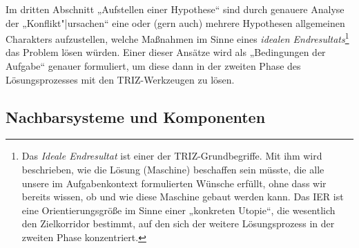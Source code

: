 \documentclass[11pt,a4paper]{article}
\begin{document}
Im dritten Abschnitt „Aufstellen einer Hypothese“ sind durch genauere Analyse
der „Konflikt"|ursachen“ eine oder (gern auch) mehrere Hypothesen allgemeinen
Charakters aufzustellen, welche Maßnahmen im Sinne eines \emph{idealen
  Endresultats}\footnote{Das \emph{Ideale Endresultat} ist einer der
  TRIZ-Grundbegriffe. Mit ihm wird beschrieben, wie die Lösung (Maschine)
  beschaffen sein müsste, die alle unsere im Aufgabenkontext formulierten
  Wünsche erfüllt, ohne dass wir bereits wissen, ob und wie diese Maschine
  gebaut werden kann.  Das IER ist eine Orientierungsgröße im Sinne einer
  „konkreten Utopie“, die wesentlich den Zielkorridor bestimmt, auf den sich
  der weitere Lösungsprozess in der zweiten Phase konzentriert.} das Problem
lösen würden.  Einer dieser Ansätze wird als „Bedingungen der Aufgabe“ genauer
formuliert, um diese dann in der zweiten Phase des Lösungsprozesses mit den
TRIZ-Werkzeugen zu lösen.

\subsection*{Nachbarsysteme und Komponenten}
\end{document}
